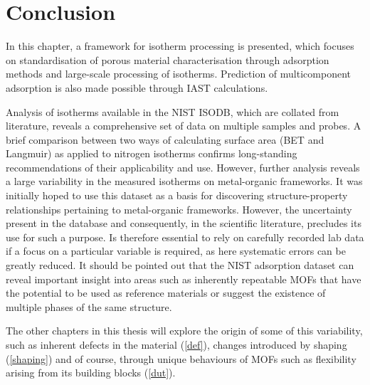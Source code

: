 
\section{Conclusion}

In this chapter, a framework for isotherm processing is
presented, which focuses on standardisation of porous material
characterisation through adsorption methods and large-scale
processing of isotherms. Prediction of multicomponent
adsorption is also made possible through \gls{IAST} calculations.

Analysis of isotherms available in the \gls{NIST} ISODB, which are collated
from literature, reveals a comprehensive set of data on multiple samples 
and probes. A brief comparison between two ways of calculating surface area
(\gls{BET} and Langmuir) as applied to nitrogen isotherms confirms
long-standing recommendations of their
applicability and use. However, further analysis reveals a large
variability in the measured isotherms on metal-organic
frameworks. It was initially hoped to use this dataset as a basis
for discovering structure-property relationships pertaining to 
metal-organic frameworks. However, the uncertainty present in the database
and consequently, in the scientific literature, precludes its 
use for such a purpose. Is therefore essential to rely on carefully
recorded lab data if a focus on a particular variable is required,
as here systematic errors can be greatly reduced.
It should be pointed out that the \gls{NIST} adsorption dataset can reveal
important insight into areas such as inherently repeatable
\glspl{MOF} that have the potential to be used as reference materials or
suggest the existence of multiple phases of the same structure.

The other chapters in this thesis will explore the origin of some of
this variability, such as inherent defects in the material (\autoref{def}),
changes introduced by shaping (\autoref{shaping}) and of course, through
unique behaviours of \glspl{MOF} such as flexibility arising from its
building blocks (\autoref{dut}).

\FloatBarrier%
\pagebreak